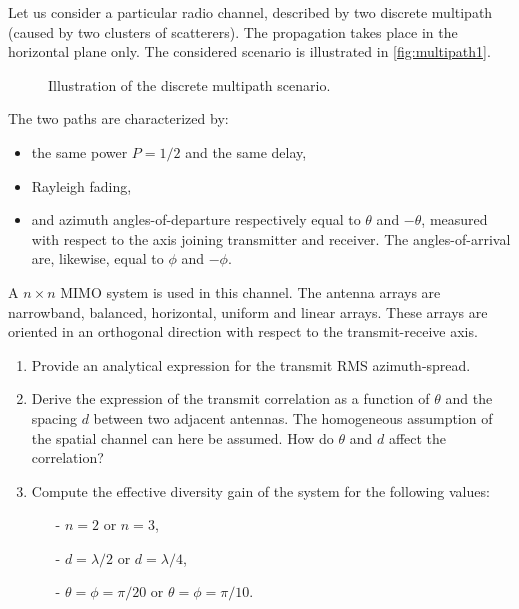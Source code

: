 \documentclass [a4paper, 11pt] {article}
\begin{document}
    \begin{exercise}{1}
    
        Let us consider a particular radio channel, described by two discrete multipath (caused by two clusters of scatterers). The propagation takes place in the horizontal plane only. The considered scenario is illustrated in \autoref{fig:multipath1}.
        
        \begin{figure}[H]
        \centering
        
        \caption{Illustration of the discrete multipath scenario.}
        \label{fig:multipath1}
        \end{figure}

    The two paths are characterized by:
    \begin{itemize}
        \item the same power $P=1/2$  and the same delay,
        \item Rayleigh fading,
        \item and azimuth angles-of-departure respectively equal to $\theta$ and $-\theta$, measured with respect to the axis joining transmitter and receiver. The angles-of-arrival are, likewise, equal to $\phi$ and $-\phi$.
    \end{itemize}
    \noindent
    A $n \times n$ MIMO system is used in this channel. The antenna arrays are narrowband, balanced, horizontal, uniform and linear arrays. These arrays are oriented in an orthogonal direction with respect to the transmit-receive axis.
    \begin{enumerate}
        \item Provide an analytical expression for the transmit RMS azimuth-spread.
        \item Derive the expression of the transmit correlation as a function of $\theta$ and the spacing $d$ between two adjacent antennas. The homogeneous assumption of the spatial channel can here be assumed. How do $\theta$ and $d$ affect the correlation?
        \item Compute the effective diversity gain of the system for the following values: 
        \begin{itemize}
            \item[-] $n=2$ or $n=3$,
            \item[-] $d = \lambda / 2$ or $d = \lambda / 4$,
            \item[-] $\theta = \phi = \pi/20$ or $\theta = \phi = \pi/10$.
        \end{itemize}
    \end{enumerate}
    
    \end{exercise}
    
\end{document}
